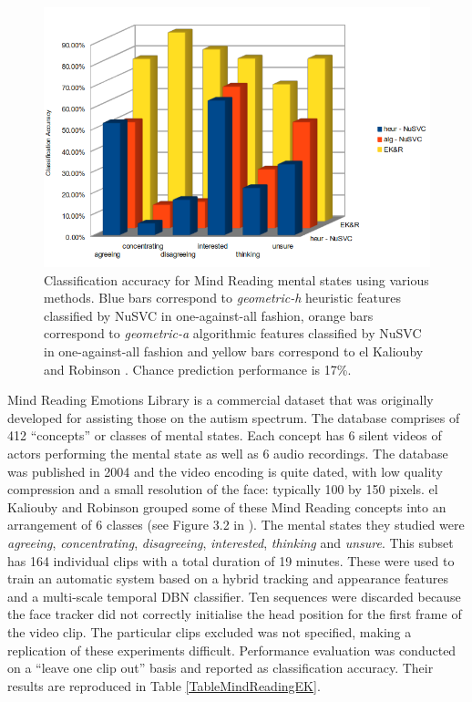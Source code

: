 \begin{figure}
\centering
\includegraphics[width = 0.9 \columnwidth]{nvcregression/mindreadingperf.png}
\caption[Classification accuracy for Mind Reading mental states using various methods.]{Classification accuracy for Mind Reading mental states using various methods. Blue bars correspond to \textit{geometric-h} heuristic features classified by NuSVC in one-against-all fashion, orange bars correspond to \textit{geometric-a} algorithmic features classified by NuSVC in one-against-all fashion and yellow bars correspond to el Kaliouby and Robinson \cite{ElKaliouby2004}. Chance prediction performance is 17\%.}
\label{FigureMindReadingPerfSummary}
\end{figure}

Mind Reading Emotions Library is a commercial dataset that was originally developed for assisting those on the autism spectrum. The database comprises of 412 ``concepts'' or classes of mental states. Each concept has 6 silent videos of actors performing the mental state as well as 6 audio recordings. The database was published in 2004 and the video encoding is quite dated, with low quality compression and a small resolution of the face: typically 100 by 150 pixels. el Kaliouby and Robinson \cite{ElKaliouby2004} grouped some of these Mind Reading concepts into an arrangement of 6 classes (see Figure 3.2 in \cite{elKaliouby2005Thesis}). The mental states they studied were \textit{agreeing}, \textit{concentrating}, \textit{disagreeing}, \textit{interested}, \textit{thinking} and \textit{unsure}. This subset has 164 individual clips with a total duration of 19 minutes. These were used to train an automatic system based on a hybrid tracking and appearance features and a multi-scale temporal \ac{DBN} classifier. Ten sequences were discarded because the face tracker did not correctly initialise the head position for the first frame of the video clip. The particular clips excluded was not specified, making a replication of these experiments difficult. Performance evaluation was conducted on a ``leave one clip out'' basis and reported as classification accuracy. Their results are reproduced in Table \ref{TableMindReadingEK}. 

